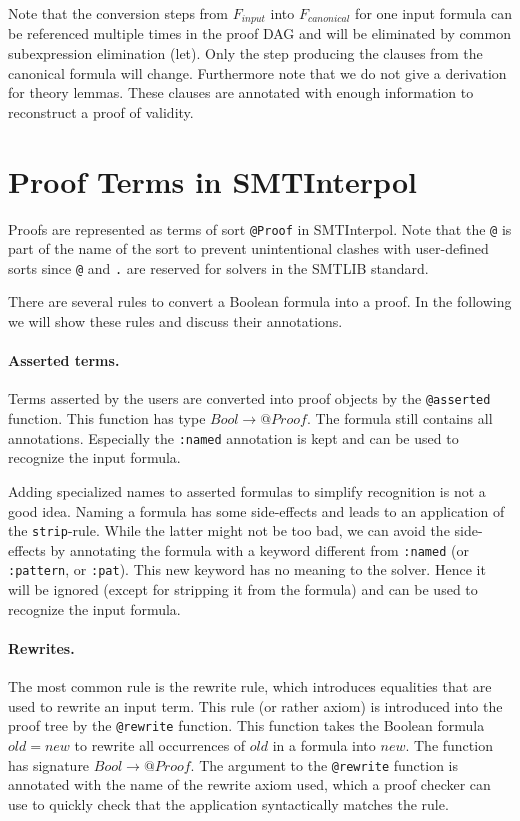 \documentclass[a4paper]{article}
\newcommand\si{SMTInterpol\xspace}
\begin{document}
Note that the conversion steps from $F_{input}$ into $F_{canonical}$
for one input formula can be referenced multiple times in the proof
DAG and will be eliminated by common subexpression elimination (let).
Only the step producing the clauses from the canonical formula will
change.  Furthermore note that we do not give a derivation for theory
lemmas.  These clauses are annotated with enough information to
reconstruct a proof of validity.

\section{Proof Terms in \si}
Proofs are represented as terms of sort \verb+@Proof+ in \si.  Note that the
\verb+@+ is part of the name of the sort to prevent unintentional clashes with
user-defined sorts since \verb+@+ and \verb+.+ are reserved for solvers in the
SMTLIB standard.

There are several rules to convert a Boolean formula into a proof.  In the
following we will show these rules and discuss their annotations.

\paragraph{Asserted terms.}  Terms asserted by the users are converted into
proof objects by the \verb+@asserted+ function.  This function has type
$Bool\rightarrow @Proof$.  The formula still contains all annotations.
Especially the \verb+:named+ annotation is kept and can be used to recognize
the input formula.

Adding specialized names to asserted formulas to simplify recognition is not a
good idea.  Naming a formula has some side-effects and leads to an application
of the \verb+strip+-rule.  While the latter might not be too bad, we can avoid
the side-effects by annotating the formula with a keyword different from
\verb+:named+ (or \verb+:pattern+, or \verb+:pat+).  This new keyword has no
meaning to the solver.  Hence it will be ignored (except for stripping it from
the formula) and can be used to recognize the input formula.

\paragraph{Rewrites.}  The most common rule is the rewrite rule, which
introduces equalities that are used to rewrite an input term.  This
rule (or rather axiom) is introduced into the proof tree by the
\verb+@rewrite+ function.  This function takes the Boolean formula
$old = new$ to rewrite all occurrences of $old$ in a formula into
$new$.  The function has signature $Bool\rightarrow @Proof$.  The
argument to the \verb+@rewrite+ function is annotated with the name of
the rewrite axiom used, which a proof checker can use to quickly check
that the application syntactically matches the rule.
\end{document}
